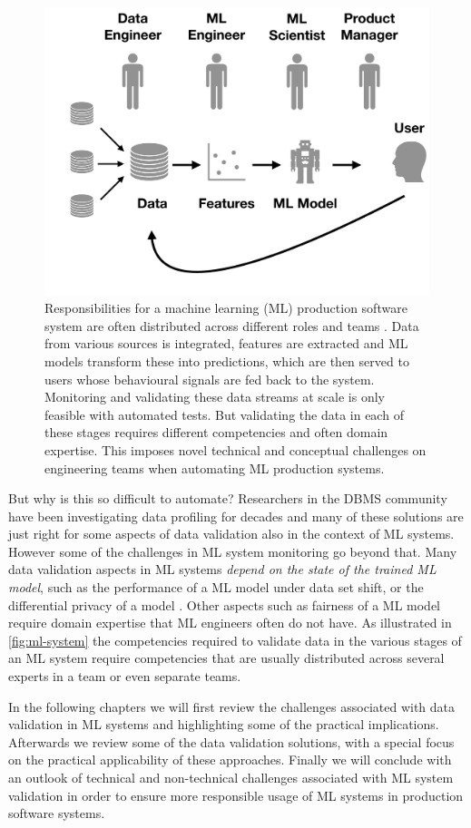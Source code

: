 \begin{figure}
\centering
\includegraphics[width=.6\textwidth]{submissions/data-validation-amazon/figs/ML-system}
\caption{Responsibilities for a machine learning (ML) production software system are often distributed across different roles and teams \cite{Polyzotis2018}. Data from various sources is integrated, features are extracted and ML models transform these into predictions, which are then served to users whose behavioural signals are fed back to the system. Monitoring and validating these data streams at scale is only feasible with automated tests. But validating the data in each of these stages requires different competencies and often domain expertise. This imposes novel technical and conceptual challenges on engineering teams when automating ML production systems.}
\label{fig:ml-system}
\end{figure}


But why is this so difficult to automate? Researchers in the DBMS community have been investigating data profiling for decades \cite{Abedjan2018} and many of these solutions are just right for some aspects of data validation also in the context of ML systems. However some of the challenges in ML system monitoring go beyond that. Many data validation aspects in ML systems {\em depend on the state of the trained ML model}, such as the performance of a ML model under data set shift, or the differential privacy of a model \cite{Dwork08differentialprivacy, Abadi2016, Bagdasaryan2019}. Other aspects such as fairness of a ML model require domain expertise that ML engineers often do not have. As illustrated in \autoref{fig:ml-system} the competencies required to validate data in the various stages of an ML system require competencies that are usually distributed across several experts in a team or even separate teams. 

In the following chapters we will first review the challenges associated with data validation in ML systems and highlighting some of the practical implications. Afterwards we review some of the data validation solutions, with a special focus on the practical applicability of these approaches. Finally we will conclude with an outlook of technical and non-technical challenges associated with ML system validation in order to ensure more responsible usage of ML systems in production software systems. 